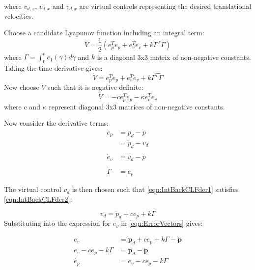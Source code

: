where $v_{d,x}$, $v_{d,x}$ and $v_{d,x}$ are virtual controls representing the desired translational velocities.

Choose a candidate Lyapunov function including an integral term:
\begin{equation}
V=\frac{1}{2}\left(e_{p}^{T}e_{p}+e_{v}^{T}e_{v}+k\Gamma^{T}\Gamma\right)
\end{equation}
where $\Gamma=\int^{t}_{0} e_{1}(\gamma) d\gamma$ and $k$ is a diagonal 3x3 matrix of non-negative constants.
Taking the time derivative gives:
\begin{equation}\label{eqn:IntBackCLFder1}
\dot{V}=e_{p}^{T}\dot{e}_{p}+e_{v}^{T}\dot{e}_{v}+k\Gamma^{T}\dot{\Gamma}
\end{equation}
Now choose $\dot{V}$ such that it is negative definite:
\begin{equation}\label{eqn:IntBackCLFder2}
\dot{V}=-ce_{p}^{T}e_{p}-\kappa e_{v}^{T}e_{v}
\end{equation}
where c and $\kappa$ represent diagonal 3x3 matrices of non-negative constants.

Now consider the derivative terms:
\begin{equation}\label{eqn:IntBackErrDer}
\begin{split}
\dot{e}_{p}&=\dot{p}_{d}-\dot{p}\\
&=\dot{p}_{d}-v_{d}\\\\
\dot{e}_{v}&=\dot{v}_{d}-\ddot{p}\\\\
\dot{\Gamma}&=e_{p}
\end{split}
\end{equation}

The virtual control $v_{d}$ is then chosen such that \eqref{eqn:IntBackCLFder1} satisfies \eqref{eqn:IntBackCLFder2}:

\begin{equation*}
v_{d}= \dot{p}_{d}+ce_{p}+k\Gamma
\end{equation*}
Substituting into the expression for $e_{v}$ in \eqref{eqn:ErrorVectors} gives:

\begin{equation}\label{eqn:e_p1}
\begin{split}
e_{v}&=\mathbf{\dot{p}}_{d}+ce_{p}+k\Gamma - \mathbf{\dot{p}}\\
e_{v}-ce_{p}-k\Gamma&=\mathbf{\dot{p}}_{d}- \mathbf{\dot{p}}\\
\dot{e_{p}}&=e_{v}-ce_{p}-k\Gamma
\end{split}
\end{equation}
 

